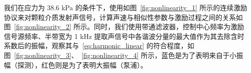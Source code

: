 

我们在应力为 38.6 \unit{\kilo\pascal} 的条件下，使用如图~\ref{fig:nonlinearity_1} 所示的连续激励协议来对颗粒介质发射声信号，计算声速与相似性参数与激励过程之间的关系如图~\ref{fig:nonlinearity_2} 所示。同时，我们使用带通滤波器，控制中心频率为激励信号源频率、半带宽为 1 \unit{\kilo\hertz} 提取声信号中各谐波分量的最大值作为其去除含时系数后的振幅，观察其与~\eqref{eq:harmonic_linear} 的符合程度，如图~\ref{fig:nonlinearity_3}、~\ref{fig:nonlinearity_4} 所示，蓝色是为了表明来自于小振幅（探测），红色则是为了表明大振幅（泵浦）。

